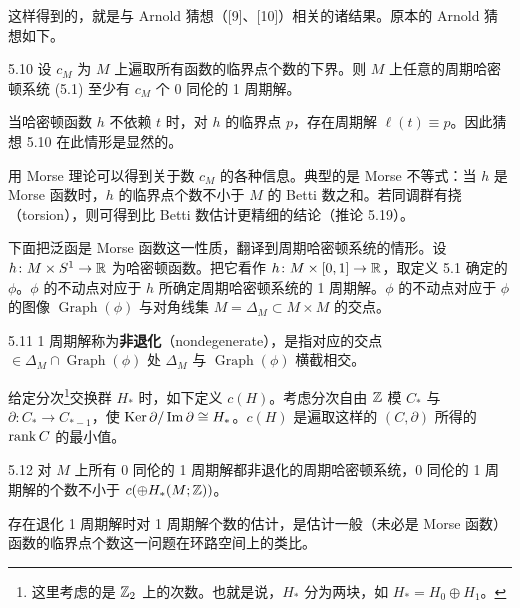 
这样得到的，就是与 Arnold 猜想（[9]、[10]）相关的诸结果。原本的 Arnold 猜想如下。

\begin{conjecture}{5.10}
  设 $c_M$ 为 $M$ 上遍取所有函数的临界点个数的下界。则 $M$ 上任意的周期哈密顿系统 (5.1) 至少有 $c_M$ 个 0 同伦的 1 周期解。
\end{conjecture}

当哈密顿函数 $h$ 不依赖 $t$ 时，对 $h$ 的临界点 $p$，存在周期解 $\ell(t)\equiv p$。因此猜想 5.10 在此情形是显然的。

用 Morse 理论可以得到关于数 $c_M$ 的各种信息。典型的是 Morse 不等式：当 $h$ 是 Morse 函数时，$h$ 的临界点个数不小于 $M$ 的 Betti 数之和。若同调群有挠（torsion），则可得到比 Betti 数估计更精细的结论（推论 5.19）。

下面把泛函是 Morse 函数这一性质，翻译到周期哈密顿系统的情形。设 $h\colon M\times S^1\to\mathbb{R}$ 为哈密顿函数。把它看作 $h\colon M\times[0,1]\to\mathbb{R}$，取定义 5.1 确定的 $\phi$。$\phi$ 的不动点对应于 $h$ 所确定周期哈密顿系统的 1 周期解。$\phi$ 的不动点对应于 $\phi$ 的图像 $\operatorname{Graph}(\phi)$ 与对角线集 $M=\Delta_M\subset M\times M$ 的交点。

\begin{definition}{5.11}
  1 周期解称为\textbf{非退化}（nondegenerate），是指对应的交点 $\in\Delta_M\cap\operatorname{Graph}(\phi)$ 处 $\Delta_M$ 与 $\operatorname{Graph}(\phi)$ 横截相交。
\end{definition}

给定分次\footnote{这里考虑的是 $\mathbb{Z}_2$ 上的次数。也就是说，$H_*$ 分为两块，如 $H_*=H_0\oplus H_1$。}交换群 $H_*$ 时，如下定义 $c(H)$。考虑分次自由 $\mathbb{Z}$ 模 $C_*$ 与 $\partial\colon C_*\to C_{*-1}$，使 $\operatorname{Ker}\partial/\operatorname{Im}\partial\cong H_*$。$c(H)$ 是遍取这样的 $(C,\partial)$ 所得的 $\operatorname{rank} C$ 的最小值。

\begin{conjecture}{5.12}
  对 $M$ 上所有 0 同伦的 1 周期解都非退化的周期哈密顿系统，0 同伦的 1 周期解的个数不小于 $c(\oplus H_*(M;\mathbb{Z}))$。
\end{conjecture}

存在退化 1 周期解时对 1 周期解个数的估计，是估计一般（未必是 Morse 函数）函数的临界点个数这一问题在环路空间上的类比。

